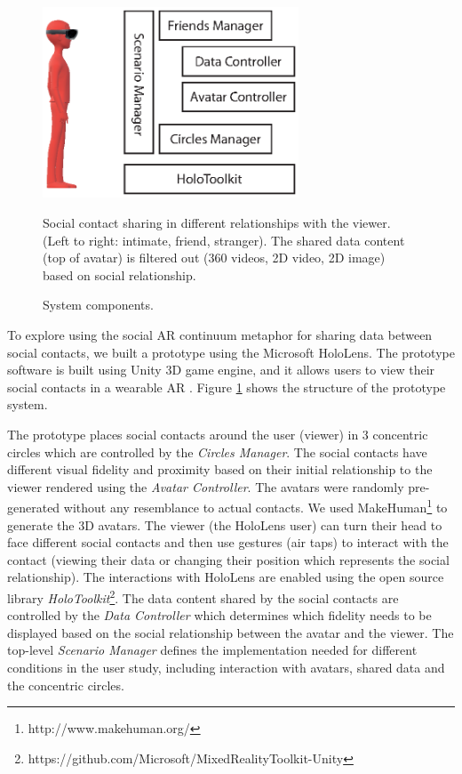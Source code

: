 \begin{figure}[ht]
    \centering
    \includegraphics[width=3in]{images/chi/images-03.eps}
    \caption{Social contact sharing in different relationships with the viewer. (Left to right: intimate, friend, stranger). The shared data content (top of avatar) is filtered out (360 videos, 2D video, 2D image) based on social relationship.}
      \caption{System components.}
      \label{fig:data:system}
\end{figure}

To explore using the social AR continuum metaphor for sharing data between social contacts, we built a prototype using the Microsoft HoloLens. The prototype software is built using Unity 3D game engine, and it allows users to view their social contacts in a wearable AR . Figure \ref{fig:data:system} shows the structure of the prototype system. 

The prototype places social contacts around the user (viewer) in 3 concentric circles which are controlled by the \textit{Circles Manager}. The social contacts have different visual fidelity and proximity based on their initial relationship to the viewer rendered using the \textit{Avatar Controller}. The avatars were randomly pre-generated without any resemblance to actual contacts. We used MakeHuman\footnote{http://www.makehuman.org/} to generate the 3D avatars. The viewer (the HoloLens user) can turn their head to face different social contacts and then use gestures (air taps) to interact with the contact (viewing their data or changing their position which represents the social relationship). The interactions with HoloLens are enabled using the open source library \textit{HoloToolkit}\footnote{https://github.com/Microsoft/MixedRealityToolkit-Unity}. The data content shared by the social contacts are controlled by the \textit{Data Controller} which determines which fidelity needs to be displayed based on the social relationship between the avatar and the viewer. The top-level \textit{Scenario Manager} defines the implementation needed for different conditions in the user study, including interaction with avatars, shared data and the concentric circles. 

